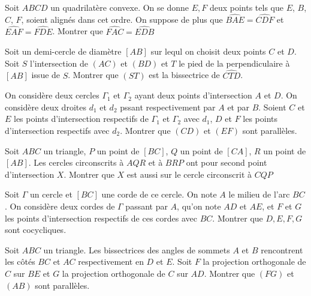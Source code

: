 \begin{exo} Soit $ABCD$ un quadrilatère convexe. On se donne $E, F$ deux points tels que $E$, $B$, $C$, $F$, soient alignés dans cet ordre. On suppose de plus que $\widehat{BAE} = \widehat{CDF}$ et $\widehat{EAF} = \widehat{FDE}$. Montrer que $\widehat{FAC}=\widehat{EDB}$
\end{exo}

\begin{exo} Soit un demi-cercle de diamètre $[AB]$ sur lequl on choisit deux points $C$ et $D$. Soit $S$ l'intersection de $(AC)$ et $(BD)$ et $T$ le pied de la perpendiculaire à $[AB]$ issue de $S$. Montrer que $(ST)$ est la bissectrice de $\widehat{CTD}$.
\end{exo}

\begin{exo} On considère deux cercles $\Gamma_1$ et $\Gamma_2$ ayant deux points d'intersection $A$ et $D$. On considère deux droites $d_1$ et $d_2$ pssant respectivement par $A$ et par $B$. Soient $C$ et $E$ les points d'intersection respectifs de $\Gamma_1$ et $\Gamma_2$ avec $d_1$, $D$ et $F$ les points d'intersection respectifs avec $d_2$. Montrer que $(CD)$ et $(EF)$ sont parallèles. 
\end{exo}

\begin{exo} Soit $ABC$ un triangle, $P$ un point de $[BC]$, $Q$ un point de $[CA]$, $R$ un point de $[AB]$. Les cercles circonscrits à $AQR$ et à $BRP$ ont pour second point d'intersection $X$. 
Montrer que $X$ est aussi sur le cercle circonscrit à $CQP$
\end{exo}

\begin{exo} Soit $\Gamma$ un cercle et $[BC]$ une corde de ce cercle. On note $A$ le milieu de l'arc $BC$. On considère deux cordes de $\Gamma$ passant par $A$, qu'on note $AD$ et $AE$, et $F$ et $G$ les points d'intersection respectifs de ces cordes avec $BC$. Montrer que $D, E, F, G$ sont cocycliques. 
\end{exo}

\begin{exo} Soit $ABC$ un triangle. Les bissectrices des angles de sommets $A$ et $B$ rencontrent les côtés $BC$ et $AC$ respectivement en $D$ et $E$. Soit $F$ la projection orthogonale de $C$ sur $BE$ et $G$ la projection orthogonale de $C$ sur $AD$. Montrer que $(FG)$ et $(AB)$ sont parallèles. 
\end{exo}


